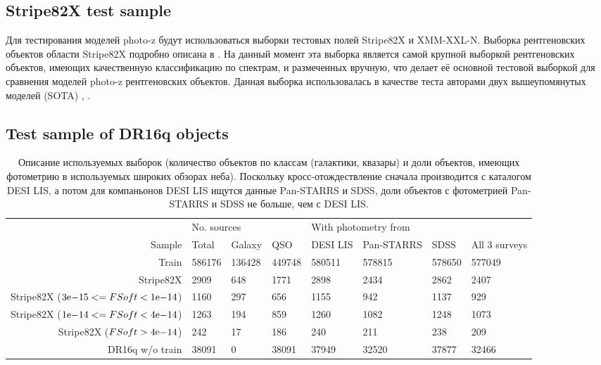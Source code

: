 \documentclass[fleqn,usenatbib]{mnras}
\begin{document}
\subsection{Stripe82X test sample}
Для тестирования моделей photo-z будут использоваться выборки тестовых полей Stripe82X и XMM-XXL-N. Выборка рентгеновских объектов области Stripe82X подробно описана в \cite{bib:ananna2017}. На данный момент эта выборка является самой крупной выборкой рентгеновских объектов, имеющих качественную классификацию по спектрам, и размеченных вручную, что делает её основной тестовой выборкой для сравнения моделей photo-z рентгеновских объектов. Данная выборка использовалась в качестве теста авторами двух вышеупомянутых моделей (SOTA) \cite{bib:ananna2017}, \cite{bib:brescia2018}. 
\subsection{Test sample of DR16q objects}
\begin{table}
	\begin{tabular}{rlllllll}
            \hline
            {} & \multicolumn{3}{l}{No. sources} & \multicolumn{4}{l}{With photometry from} \\
            Sample &       Total &  Galaxy &     QSO &             DESI LIS & Pan-STARRS &    SDSS & All 3 surveys \\
            \hline
            Train                                                          &      586176 &  136428 &  449748 &               580511 &     578815 &  578650 &        577049 \\
            Stripe82X                                                      &        2909 &     648 &    1771 &                 2898 &       2434 &    2862 &          2407 \\
            Stripe82X (${3}\mathrm{e}{-15} <= FSoft < {1}\mathrm{e}{-14}$) &        1160 &     297 &     656 &                 1155 &        942 &    1137 &           929 \\
            Stripe82X (${1}\mathrm{e}{-14} <= FSoft < {4}\mathrm{e}{-14}$) &        1263 &     194 &     859 &                 1260 &       1082 &    1248 &          1073 \\
            Stripe82X ($FSoft > {4}\mathrm{e}{-14}$)                       &         242 &      17 &     186 &                  240 &        211 &     238 &           209 \\
            DR16q w/o train                                                &       38091 &       0 &   38091 &                37949 &      32520 &   37877 &         32466 \\
            \hline
            \end{tabular}
            \caption{Описание используемых выборок (количество объектов по классам (галактики, квазары) и доли объектов, имеющих фотометрию в используемых широких обзорах неба). Поскольку кросс-отождествление сначала производится с каталогом DESI LIS, а потом для компаньонов DESI LIS ищутся данные Pan-STARRS и SDSS, доли объектов с фотометрией Pan-STARRS и SDSS не больше, чем с DESI LIS.}
\end{table}
\end{document}

